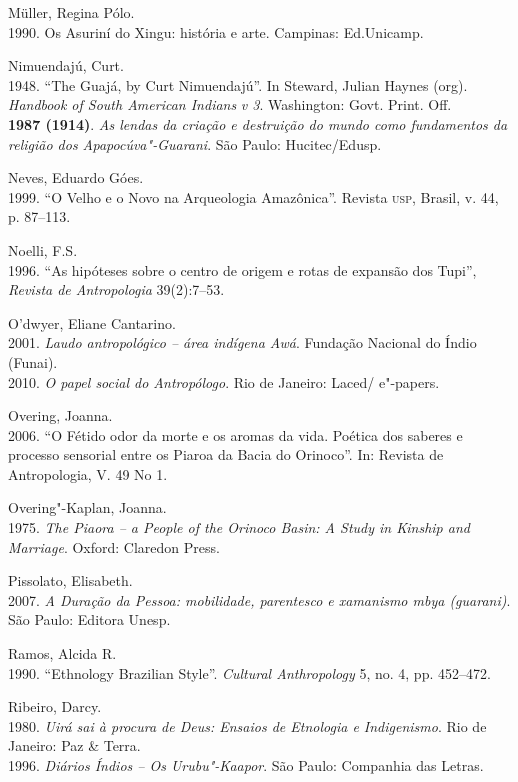 \begin{bibliohedra}
Müller, Regina Pólo.\\
1990. Os Asuriní do Xingu: história e arte. Campinas:
Ed.Unicamp.

Nimuendajú, Curt.\\
1948. ``The Guajá, by Curt Nimuendajú''. In Steward, Julian
Haynes (org). \emph{Handbook of South American Indians} \emph{v 3}.
Washington: Govt. Print. Off.\\
\textbf{1987 (1914)}. \emph{As lendas da criação e destruição do mundo
como fundamentos da religião dos Apapocúva"-Guarani}. São Paulo:
Hucitec/Edusp.

Neves, Eduardo Góes.\\
1999. ``O Velho e o Novo na Arqueologia Amazônica''. Revista
\textsc{usp}, Brasil, v. 44, p. 87--113.

Noelli, F.S.\\
1996. ``As hipóteses sobre o centro de origem e rotas de
expansão dos Tupi'', \emph{Revista de Antropologia} 39(2):7--53.

O'dwyer, Eliane Cantarino.\\
2001. \emph{Laudo antropológico -- área indígena Awá}. Fundação
Nacional do Índio (Funai).\\
2010. \emph{O papel social do Antropólogo}. Rio de Janeiro:
Laced/ e"-papers.

Overing, Joanna.\\
2006. ``O Fétido odor da morte e os aromas da vida. Poética dos
saberes e processo sensorial entre os Piaroa da Bacia do Orinoco''. In:
Revista de Antropologia, V. 49 No 1.

Overing"-Kaplan, Joanna.\\
1975. \emph{The Piaora -- a People of the Orinoco Basin: A Study
in Kinship and Marriage}. Oxford: Claredon Press.

Pissolato, Elisabeth.\\
2007. \emph{A Duração da Pessoa: mobilidade, parentesco e
xamanismo mbya (guarani)}. São Paulo: Editora Unesp.

Ramos, Alcida R.\\
1990. ``Ethnology Brazilian Style''. \emph{Cultural Anthropology}
5, no. 4, pp. 452--472.

Ribeiro, Darcy.\\
1980. \emph{Uirá sai à procura de Deus: Ensaios de Etnologia e
Indigenismo}. Rio de Janeiro: Paz \& Terra.\\
1996. \emph{Diários Índios -- Os Urubu"-Kaapor}. São Paulo:
Companhia das Letras.


\end{bibliohedra}
